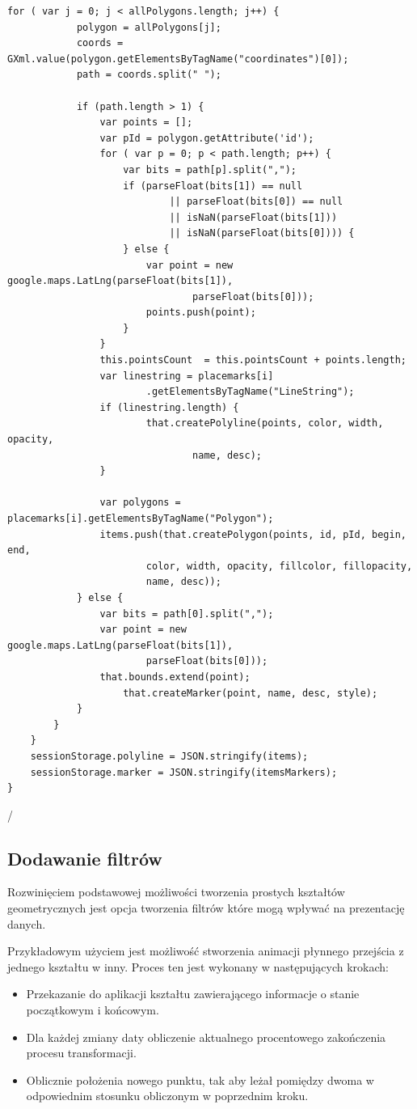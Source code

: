 \begin{lstlisting}[label={lst:minconf},caption={Parser plików.}]
		for ( var j = 0; j < allPolygons.length; j++) {
			polygon = allPolygons[j];
			coords = GXml.value(polygon.getElementsByTagName("coordinates")[0]);
			path = coords.split(" ");

			if (path.length > 1) {
				var points = [];
				var pId = polygon.getAttribute('id');
				for ( var p = 0; p < path.length; p++) {
					var bits = path[p].split(",");
					if (parseFloat(bits[1]) == null
							|| parseFloat(bits[0]) == null
							|| isNaN(parseFloat(bits[1]))
							|| isNaN(parseFloat(bits[0]))) {
					} else {
						var point = new google.maps.LatLng(parseFloat(bits[1]),
								parseFloat(bits[0]));
						points.push(point);
					}
				}
				this.pointsCount  = this.pointsCount + points.length;
				var linestring = placemarks[i]
						.getElementsByTagName("LineString");
				if (linestring.length) {
						that.createPolyline(points, color, width, opacity,
								name, desc);
				}

				var polygons = placemarks[i].getElementsByTagName("Polygon");
				items.push(that.createPolygon(points, id, pId, begin, end,
						color, width, opacity, fillcolor, fillopacity,
						name, desc));
			} else {
				var bits = path[0].split(",");
				var point = new google.maps.LatLng(parseFloat(bits[1]),
						parseFloat(bits[0]));
				that.bounds.extend(point);
					that.createMarker(point, name, desc, style);
			}
		}
	}
	sessionStorage.polyline = JSON.stringify(items);
	sessionStorage.marker = JSON.stringify(itemsMarkers);
}

\end{lstlisting}/

\subsection{Dodawanie filtrów}
\label{subsec:filters}

Rozwinięciem podstawowej możliwości tworzenia prostych kształtów geometrycznych jest opcja tworzenia filtrów które mogą wpływać na prezentację danych.

Przykładowym użyciem jest możliwość stworzenia animacji płynnego przejścia z jednego kształtu w inny. Proces ten jest wykonany w następujących krokach:

\begin{itemize}
\item
Przekazanie do aplikacji kształtu zawierającego informacje o stanie początkowym i końcowym.
\item
Dla każdej zmiany daty obliczenie aktualnego procentowego zakończenia procesu transformacji.
\item
Oblicznie położenia nowego punktu, tak aby leżał pomiędzy dwoma w odpowiednim stosunku obliczonym w poprzednim kroku.
\end{itemize}

